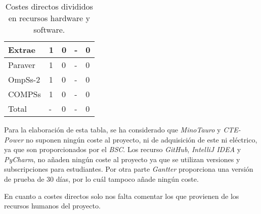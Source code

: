 \begin{table}[H]
\begin{tabular}{| l | l | l | l | l |}
    \hline
    Extrae                      & 1 & 0     & - & 0\\
    \hline
    Paraver                     & 1 & 0     & - & 0\\
    \hline
    OmpSs-2                     & 1 & 0     & - & 0\\
    \hline
    COMPSs                      & 1 & 0     & - & 0\\
    \hline
    \rowcolor{gray!50}
    Total                       & - & 0     & - & 0\\
    \hline
 \end{tabular}
\caption{Costes directos divididos en recursos hardware y software.}
\end{table}

Para la elaboración de esta tabla, se ha considerado que \textit{MinoTauro} y \textit{CTE-Power} no suponen ningún coste al proyecto, ni de adquisición de este ni eléctrico, ya que son proporcionados por el \textit{BSC}. Los recurso \textit{GitHub}, \textit{IntelliJ IDEA} y \textit{PyCharm}, no añaden ningún coste al proyecto ya que se utilizan versiones y subscripciones para estudiantes. Por otra parte \textit{Gantter} proporciona una versión de prueba de 30 días, por lo cuál tampoco añade ningún coste.
\par\bigskip 

En cuanto a costes directos solo nos falta comentar los que provienen de los recursos humanos del proyecto.

\begin{comment}
begin{table}[ht!]
 \centering
 \begin{tabular}{c|c|c|c|} 
  \cline{2-4}
                & Horas (h) & Precio/Hora(\euro) & Total(\euro) \\
  \cline{2-4}\hline
  Desarrollador & 489 & 10 & 4890 \\
  \hline
  Director & 55 & 30 & 1650\\
  \hline 
  Codirector & 50 & 30 & 1500\\
  \hline
  Soporte & 20 & 20 & 400\\
  \hline
  \rowcolor{gray!50}
  Total & - & - & 8440\\
  \hline
 \end{tabular}
\caption{Costes directos provenientes de recursos humanos.}
\end{table}
\end{comment}

